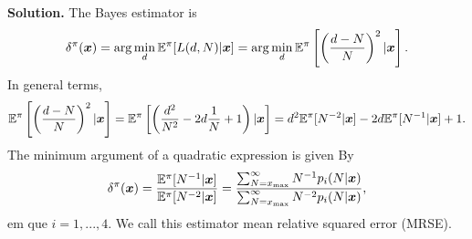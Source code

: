 \vspace{2ex}

    {\bf Solution.} The Bayes estimator is 
    $$\delta^{\pi}(\boldsymbol{x}) =
    \arg\min_d \mathbb{E}^{\pi}[L(d, N)|\boldsymbol{x}] = \arg\min_d\mathbb{E}^{\pi}\left[\left(\frac{d
    - N}{N}\right)^2|\boldsymbol{x}\right].$$
    In general terms, 
    \begin{equation}
        \mathbb{E}^{\pi}\left[\left(\frac{d
        - N}{N}\right)^2|\boldsymbol{x}\right] = \mathbb{E}^{\pi}\left[
            \left(\frac{d^2}{N^2} - 2d\frac{1}{N} + 1 \right)| \boldsymbol{x}
        \right] = d^2\mathbb{E}^{\pi}[N^{-2}|\boldsymbol{x}] -2d\mathbb{E}^{\pi}[N^{-1}|\boldsymbol{x}] + 1.
    \end{equation}
    The minimum argument of a quadratic expression is given By
    $$
    \delta^{\pi}(\boldsymbol{x}) = \frac{\mathbb{E}^{\pi}[N^{-1}|\boldsymbol{x}]}{\mathbb{E}^{\pi}[N^{-2}|\boldsymbol{x}]} = \frac{\sum_{N=x_{\max}}^{\infty} N^{-1} p_i(N|\boldsymbol{x})}{\sum_{N=x_{\max}}^{\infty} N^{-2} p_i(N|\boldsymbol{x})},
    $$
    em que $i=1,...,4$. We call this estimator mean relative squared error
    (MRSE). 
